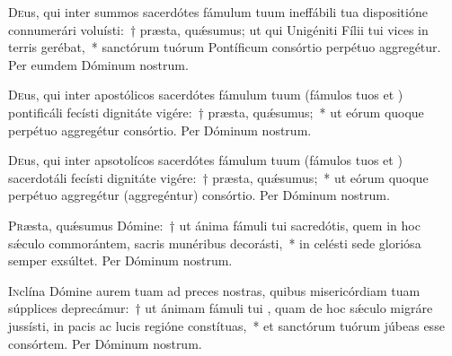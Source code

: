 \documentclass[vesperale_romanum]{subfiles}
\begin{document}

\lettrine{D}{e}us, qui inter summos sacerdótes fámulum tuum \nomen{} ineffábili tua dispositióne connumerári voluísti:~†
 præsta, quǽsumus; ut qui Unigéniti Fílii tui vices in terris gerébat,~*
  san\-ctórum tuórum Pontíficum consórtio perpétuo aggregétur. Per eumdem Dóminum nostrum.


\lettrine{D}{e}us,  qui inter apostólicos sacerdótes fámulum tuum \nomen{} (fámulos tuos \nomen{} et  \nomen{}) 
pontificáli fecísti dignitáte vigére:~† præsta, quǽsumus;~* ut eórum quoque perpétuo aggregétur consórtio. Per Dóminum nostrum.






\lettrine{D}{e}us, qui inter apsotolícos sacerdótes fámulum tuum \nomen{} (fámulos tuos \nomen{} et \nomen{})
 sacerdotáli fecísti dignitáte vigére:~† præsta, quǽsumus;~*
  ut eórum quoque perpétuo aggregétur (aggregéntur) consórtio. Per Dóminum nostrum.


\lettrine{P}{r}æsta, quǽsumus Dómine:~† ut ánima fámuli tui \nomen{} sacredótis, quem in hoc sǽculo commorántem,
 sacris munéribus decorásti,~* in celésti sede gloriósa semper exsúltet. 
Per Dóminum nostrum.


\lettrine{I}{n}clína Dómine aurem tuam ad preces nostras, quibus misericórdiam tuam súpplices deprecámur:~† ut ánimam fámuli tui \nomen{}, quam de hoc sǽculo migráre jussísti, in pacis ac lucis regióne constítuas,~* et san\-ctórum tuórum júbeas esse consórtem. Per Dóminum nostrum.
\end{document}

